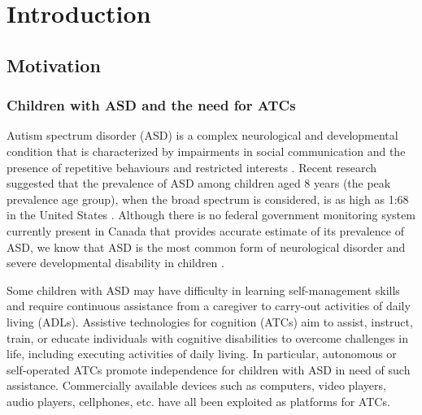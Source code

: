 \documentclass{ut-thesis}
\begin{document}



\chapter{Introduction}


\section{Motivation}

\subsection{Children with ASD and the need for ATCs}

Autism spectrum disorder (ASD) is a complex neurological and developmental condition that is characterized by impairments in social communication and the presence of repetitive behaviours and restricted interests \cite{american2013diagnostic}.  Recent research suggested that the prevalence of ASD among children aged 8 years (the peak prevalence age group), when the broad spectrum is considered, is as high as 1:68 in the United States \cite{baoi2014prevalence}.  Although there is no federal government monitoring system currently present in Canada that provides accurate estimate of its prevalence of ASD, we know that ASD is the most common form of neurological disorder and severe developmental disability in children \cite{autism2014facts}.

Some children with ASD may have difficulty in learning self-management skills and require continuous assistance from a caregiver to carry-out activities of daily living (ADLs).  Assistive technologies for cognition (ATCs) aim to assist, instruct, train, or educate individuals with cognitive disabilities to overcome challenges in life, including executing activities of daily living.  In particular, autonomous or self-operated ATCs promote independence for children with ASD in need of such assistance.  Commercially available devices such as computers, video players, audio players, cellphones, etc. have all been exploited as platforms for ATCs.
\end{document}
